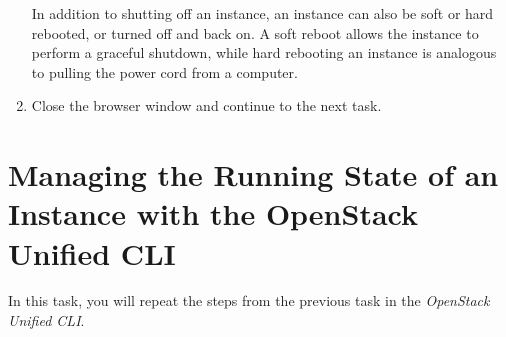 \documentclass[letterpaper, 12pt]{article}
\begin{document}
\begin{enumerate}
    \begin{tipbox}
        In addition to shutting off an instance, an instance can also be soft or hard rebooted, or turned off and back on.
        A soft reboot allows the instance to perform a graceful shutdown, while hard rebooting an instance is analogous to pulling the power cord from a computer.
    \end{tipbox}

    \item Close the browser window and continue to the next task.
\end{enumerate}

\section{Managing the Running State of an Instance with the OpenStack Unified CLI}
\label{sec:managing_the_power_state_of_an_instance_cli}
In this task, you will repeat the steps from the previous task in the \textit{OpenStack Unified CLI}.
\end{document}

